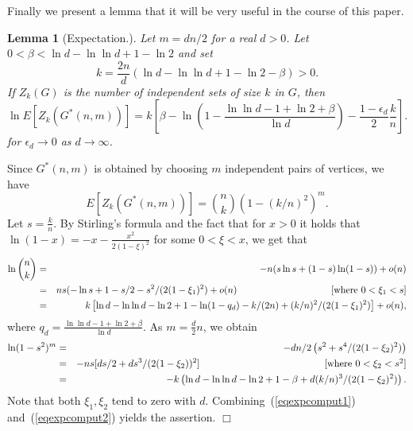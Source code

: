 \documentclass[a4paper,10pt]{article}
\makeatletter
\newtheorem{lemma}{Lemma}\renewcommand{\thelemma}{\arabic{lemma}}
\newenvironment{proof}{\noindent{\bf Proof\@:}}{\hfill $\Box$\\}
\makeatother
\begin{document}
\noindent
Finally we present a lemma that it will be very useful 
in the course of this paper.


\begin{lemma}[Expectation.]\label{lemma:expectation}
Let $m=dn/2$ for a real $d>0$.
Let $0<\beta<\ln d-\ln\ln d+1-\ln 2$ and set
	\begin{displaymath}
	k=\frac{2n}{d}\left(\ln d-\ln\ln d+1-\ln 2-\beta \right)>0.
	\end{displaymath}
If $Z_k(G)$ is the number of independent sets of size  $k$ in $G$, then
	\begin{displaymath}
		\ln E[Z_k(G^*(n,m))]=k\left[\beta
			-\ln\left(1-\frac{\ln \ln d-1+\ln 2+\beta}{\ln d}\right)
		-\frac{1-\epsilon_d}{2}\frac kn
		\right].
	\end{displaymath}
for $\epsilon_d\to 0$ as $d\to \infty$.
\end{lemma}
\begin{proof}
Since $G^*(n,m)$ is obtained by choosing $m$ independent pairs of
vertices, we have
\begin{equation}\label{eqexpgeneral}
E[Z_k(G^*(n,m))]={n \choose k}(1-(k/n)^2)^m.
\end{equation}
Let $s=\frac{k}{n}$.
By Stirling's formula and the fact that for $x>0$ it holds that
$\ln(1-x)=-x-\frac{x^2}{2(1-\xi)^2}$ for  some $0<\xi<x$, we get
that
\begin{eqnarray}
\ln {n \choose k}&=& -n(s\ln s+(1-s)\ln(1-s)) +o(n) \nonumber \\ 
&=& ns(-\ln s+1 - s/2-s^2/(2(1-\xi_1)^2)+o(n) \hspace{3.5cm}\mbox{[where $0<\xi_1<s$]} \nonumber\\ 
&=& k\left[\ln d-\ln\ln d-\ln 2 +1 - \ln (1-q_d)-k/(2n) +(k/n)^2/(2(1-\xi_1)^2)\right]+o(n),
\label{eqexpcomput1}
\end{eqnarray}
where $q_d=\frac{\ln \ln d-1+\ln 2+\beta}{\ln d}$.
As $m=\frac{d}{2}n$, we obtain
\begin{eqnarray}\ln (1-s^2)^m&=& -dn/2\left(s^2+s^4/(2(1-\xi_2)^2)\right) \nonumber \\
&=&-ns[ds/2+ds^3/(2(1-\xi_2))^2 ] \hspace{4.5cm}\mbox{[where $0<\xi_2<s^2$]} \nonumber \\ 
&=&-k\left(\ln d-\ln\ln d-\ln 2 +1-\beta +d(k/n)^3/(2(1-\xi_2)^2) \right ).
\label{eqexpcomput2}
\end{eqnarray}
Note that both $\xi_1,\xi_2$ tend to zero with $d$.
Combining~(\ref{eqexpcomput1}) and~(\ref{eqexpcomput2}) 
yields the assertion.
\end{proof}
\end{document}
